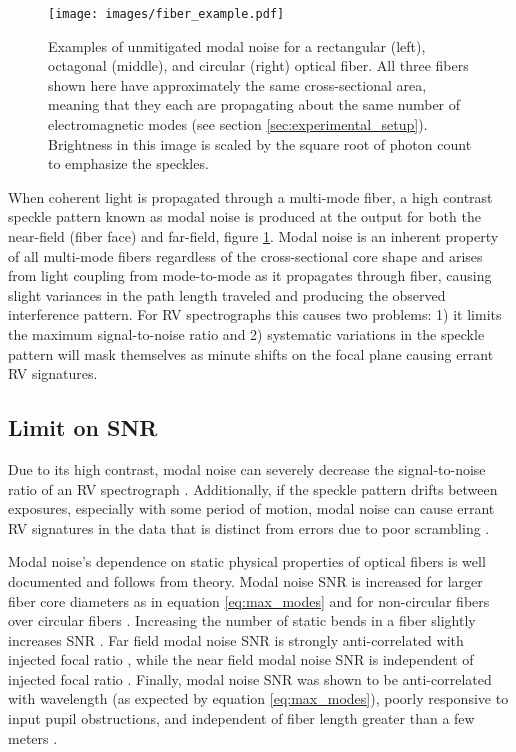 \documentclass[twocolumn]{emulateapj}
\begin{document}

\begin{figure}
\centering
	\texttt{[image: images/fiber\_example.pdf]}
	\caption{Examples of unmitigated modal noise for a rectangular (left), octagonal (middle), and circular (right) optical fiber. All three fibers shown here have approximately the same cross-sectional area, meaning that they each are propagating about the same number of electromagnetic modes (see section \ref{sec:experimental_setup}). Brightness in this image is scaled by the square root of photon count to emphasize the speckles.}
\label{fig:fiber_example}
\end{figure}

When coherent light is propagated through a multi-mode fiber, a high contrast speckle pattern known as modal noise is produced at the output for both the near-field (fiber face) and far-field, figure \ref{fig:fiber_example}. Modal noise is an inherent property of all multi-mode fibers regardless of the cross-sectional core shape \citep{Sablowski2015} and arises from light coupling from mode-to-mode as it propagates through fiber, causing slight variances in the path length traveled and producing the observed interference pattern. For RV spectrographs this causes two problems: 1) it limits the maximum signal-to-noise ratio and 2) systematic variations in the speckle pattern will mask themselves as minute shifts on the focal plane causing errant RV signatures.

\subsection{Limit on SNR}

Due to its high contrast, modal noise can severely decrease the signal-to-noise ratio of an RV spectrograph \citep{Epworth1978, Baudrand2001, Lemke2011}. Additionally, if the speckle pattern drifts between exposures, especially with some period of motion, modal noise can cause errant RV signatures in the data that is distinct from errors due to poor scrambling \citep{Mahadevan2014}.

Modal noise's dependence on static physical properties of optical fibers is well documented and follows from theory. Modal noise SNR is increased for larger fiber core diameters as in equation \ref{eq:max_modes} \citep{Sablowski2015, Lemke2010} and for non-circular fibers over circular fibers \citep{Sturmer2016, Sablowski2015}. Increasing the number of static bends in a fiber slightly increases SNR \citep{Imai1979}. Far field modal noise SNR is strongly anti-correlated with injected focal ratio \citep{Sablowski2015}, while the near field modal noise SNR is independent of injected focal ratio \citep{Baudrand2001}. Finally, modal noise SNR was shown to be anti-correlated with wavelength (as expected by equation \ref{eq:max_modes}), poorly responsive to input pupil obstructions, and independent of fiber length greater than a few meters \citep{Baudrand2001}.
\end{document}
